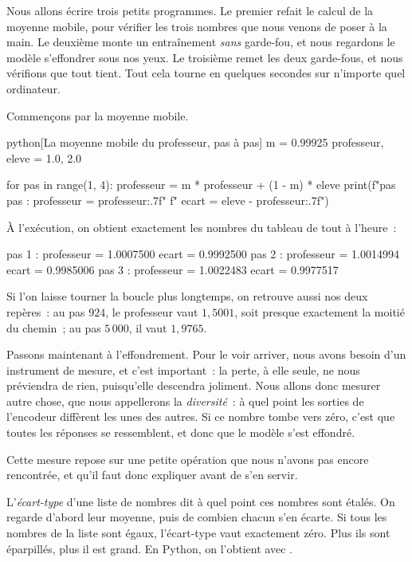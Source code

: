 Nous allons écrire trois petits programmes. Le premier refait le calcul de
la moyenne mobile, pour vérifier les trois nombres que nous venons de poser
à la main. Le deuxième
monte un entraînement \emph{sans} garde-fou, et nous regardons le modèle
s'effondrer sous nos yeux. Le troisième remet les deux garde-fous, et nous
vérifions que tout tient. Tout cela tourne en quelques secondes sur
n'importe quel ordinateur.

Commençons par la moyenne mobile.

\begin{code}{python}[La moyenne mobile du professeur, pas à pas]
m = 0.99925
professeur, eleve = 1.0, 2.0

for pas in range(1, 4):
    professeur = m * professeur + (1 - m) * eleve
    print(f"pas {pas} : professeur = {professeur:.7f}"
          f"   ecart = {eleve - professeur:.7f}")
\end{code}

À l'exécution, on obtient exactement les nombres du tableau de tout à
l'heure~:

\begin{sortie}
pas 1 : professeur = 1.0007500   ecart = 0.9992500
pas 2 : professeur = 1.0014994   ecart = 0.9985006
pas 3 : professeur = 1.0022483   ecart = 0.9977517
\end{sortie}

Si l'on laisse tourner la boucle plus longtemps, on retrouve aussi nos deux
repères~: au pas $924$, le professeur vaut $1{,}5001$, soit presque exactement
la moitié du chemin~; au pas $5\,000$, il vaut $1{,}9765$.

Passons maintenant à l'effondrement. Pour le voir arriver, nous avons besoin
d'un instrument de mesure, et c'est important~: la perte, à elle seule, ne
nous préviendra de rien, puisqu'elle descendra joliment. Nous allons donc
mesurer autre chose, que nous appellerons la \emph{diversité}~: à quel point
les sorties de l'encodeur diffèrent les unes des autres. Si ce nombre tombe
vers zéro, c'est que toutes les réponses se ressemblent, et donc que le
modèle s'est effondré.

Cette mesure repose sur une petite opération que nous n'avons pas encore
rencontrée, et qu'il faut donc expliquer avant de s'en servir.

\begin{definition}
L'\emph{écart-type} d'une liste de nombres dit à quel point ces nombres sont
étalés. On regarde d'abord leur moyenne, puis de combien chacun s'en écarte.
Si tous les nombres de la liste sont égaux, l'écart-type vaut exactement
zéro. Plus ils sont éparpillés, plus il est grand. En Python, on l'obtient
avec .
\end{definition}

